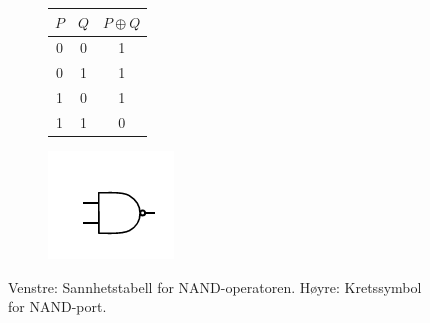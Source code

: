 \begin{center}
\begin{figure}[h]
\begin{subfigure}{.3\textwidth}
	\begin{tabular}{|c|c|c|}
	\hline
	$P$ & $Q$ & $P \oplus Q$ \\
	\hline
	0 & 0 & 1\\
	0 & 1 & 1 \\
	1 & 0 & 1 \\
	1 & 1 & 0 \\
	\hline
	\end{tabular}
\end{subfigure}
\begin{subfigure}{.3\textwidth}
	\includegraphics{./gate_nand}
\end{subfigure}
\caption{Venstre: Sannhetstabell for NAND-operatoren. Høyre: Kretssymbol for NAND-port.}
\end{figure}
\end{center}

